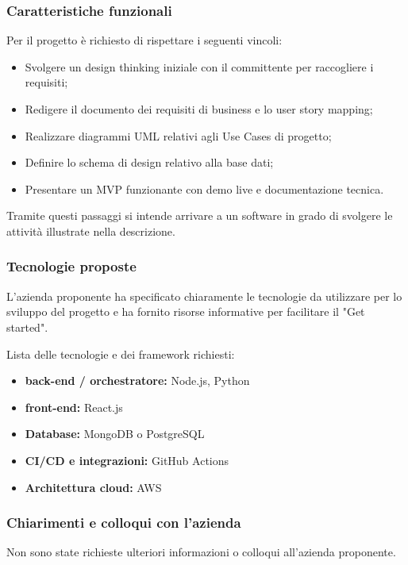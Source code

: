 \documentclass[a4paper,11pt]{article}
\begin{document}
\subsubsection{Caratteristiche funzionali}
Per il progetto è richiesto di rispettare i seguenti vincoli:

\begin{itemize}[leftmargin=*]
  \item Svolgere un design thinking iniziale con il committente per raccogliere i requisiti;
  \item Redigere il documento dei requisiti di business e lo user story mapping;
  \item Realizzare diagrammi UML relativi agli Use Cases di progetto;
  \item Definire lo schema di design relativo alla base dati;
  \item Presentare un MVP funzionante con demo live e documentazione tecnica.
\end{itemize}

Tramite questi passaggi si intende arrivare a un software in grado di svolgere le attività illustrate nella descrizione.

\subsubsection{Tecnologie proposte}

L'azienda proponente ha specificato chiaramente le tecnologie da utilizzare per lo sviluppo del progetto e ha fornito risorse informative per facilitare il "Get started".

Lista delle tecnologie e dei framework richiesti:

\begin{itemize}[leftmargin=*]
  \item \textbf{back-end / orchestratore:} Node.js, Python
  \item \textbf{front-end:} React.js
  \item \textbf{Database:} MongoDB o PostgreSQL
  \item \textbf{CI/CD e integrazioni:} GitHub Actions
  \item \textbf{Architettura cloud:} AWS
\end{itemize}

\subsubsection{Chiarimenti e colloqui con l'azienda}
Non sono state richieste ulteriori informazioni o colloqui all'azienda proponente.
\end{document}
